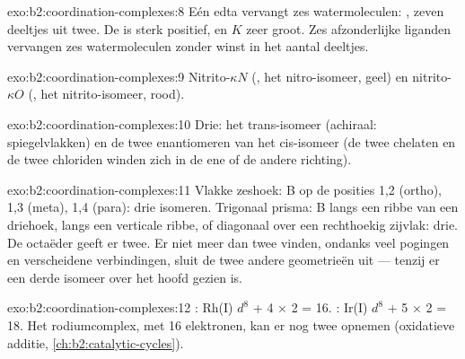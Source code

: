 \begin{solution}{exo:b2:coordination-complexes:8}
Eén edta vervangt zes watermoleculen: , zeven deeltjes uit twee. De  is sterk positief, en
$K$ zeer groot. Zes afzonderlijke liganden vervangen zes watermoleculen zonder winst in het
aantal deeltjes.
\end{solution}

\begin{solution}{exo:b2:coordination-complexes:9}
Nitrito-$\kappa N$ (, het nitro-isomeer, geel) en nitrito-$\kappa O$
(, het nitrito-isomeer, rood).
\end{solution}

\begin{solution}{exo:b2:coordination-complexes:10}
Drie: het trans-isomeer (achiraal: spiegelvlakken) en de twee enantiomeren van het cis-isomeer
(de twee chelaten en de twee chloriden winden zich in de ene of de andere richting).
\end{solution}

\begin{solution}{exo:b2:coordination-complexes:11}
Vlakke zeshoek: B op de posities 1,2 (ortho), 1,3 (meta), 1,4 (para): drie isomeren.
Trigonaal prisma: B langs een ribbe van een driehoek, langs een verticale ribbe, of diagonaal over een
rechthoekig zijvlak: drie. De octaëder geeft er twee. Er niet meer dan twee vinden, ondanks
veel pogingen en verscheidene verbindingen, sluit de twee andere geometrieën uit --- tenzij er een
derde isomeer over het hoofd gezien is.
\end{solution}

\begin{solution}{exo:b2:coordination-complexes:12}
: Rh(I) $d^8$ + 4 × 2 = 16. : Ir(I) $d^8$ + 5 × 2 =
18. Het rodiumcomplex, met 16 elektronen, kan er nog twee opnemen (oxidatieve additie,
\cref{ch:b2:catalytic-cycles}).
\end{solution}

